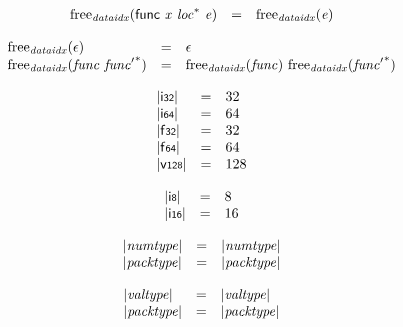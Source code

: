 $$
\begin{array}{@{}lcl@{}l@{}}
{\mathrm{free}}_{{\mathit{dataidx}}}(\mathsf{func}~{\mathit{x}}~{{\mathit{loc}}^\ast}~{\mathit{e}}) &=& {\mathrm{free}}_{{\mathit{dataidx}}}({\mathit{e}}) &  \\
\end{array}
$$

$$
\begin{array}{@{}lcl@{}l@{}}
{\mathrm{free}}_{{\mathit{dataidx}}}(\epsilon) &=& \epsilon &  \\
{\mathrm{free}}_{{\mathit{dataidx}}}({\mathit{func}}~{{\mathit{func}'}^\ast}) &=& {\mathrm{free}}_{{\mathit{dataidx}}}({\mathit{func}})~{\mathrm{free}}_{{\mathit{dataidx}}}({{\mathit{func}'}^\ast}) &  \\
\end{array}
$$

\vspace{1ex}

\vspace{1ex}

\vspace{1ex}

$$
\begin{array}{@{}lcl@{}l@{}}
{|\mathsf{i{\scriptstyle32}}|} &=& 32 &  \\
{|\mathsf{i{\scriptstyle64}}|} &=& 64 &  \\
{|\mathsf{f{\scriptstyle32}}|} &=& 32 &  \\
{|\mathsf{f{\scriptstyle64}}|} &=& 64 &  \\
{|\mathsf{v{\scriptstyle128}}|} &=& 128 &  \\
\end{array}
$$

$$
\begin{array}{@{}lcl@{}l@{}}
{|\mathsf{i{\scriptstyle8}}|} &=& 8 &  \\
{|\mathsf{i{\scriptstyle16}}|} &=& 16 &  \\
\end{array}
$$

$$
\begin{array}{@{}lcl@{}l@{}}
{|{\mathit{numtype}}|} &=& {|{\mathit{numtype}}|} &  \\
{|{\mathit{packtype}}|} &=& {|{\mathit{packtype}}|} &  \\
\end{array}
$$

$$
\begin{array}{@{}lcl@{}l@{}}
{|{\mathit{valtype}}|} &=& {|{\mathit{valtype}}|} &  \\
{|{\mathit{packtype}}|} &=& {|{\mathit{packtype}}|} &  \\
\end{array}
$$

